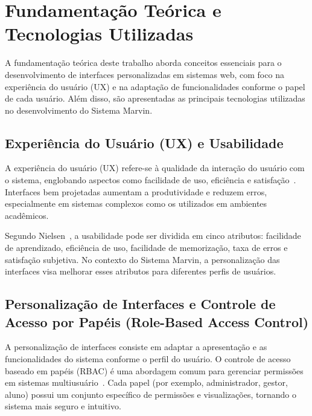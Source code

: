 

\chapter{Fundamentação Teórica e Tecnologias Utilizadas}
\label{sec-fundteo}

A fundamentação teórica deste trabalho aborda conceitos essenciais para o desenvolvimento de interfaces personalizadas em sistemas web, com foco na experiência do usuário (UX) e na adaptação de funcionalidades conforme o papel de cada usuário. Além disso, são apresentadas as principais tecnologias utilizadas no desenvolvimento do Sistema Marvin.

\section{Experiência do Usuário (UX) e Usabilidade}

A experiência do usuário (UX) refere-se à qualidade da interação do usuário com o sistema, englobando aspectos como facilidade de uso, eficiência e satisfação~\cite{norman2013design}. Interfaces bem projetadas aumentam a produtividade e reduzem erros, especialmente em sistemas complexos como os utilizados em ambientes acadêmicos.

Segundo Nielsen~\cite{nielsen1994usability}, a usabilidade pode ser dividida em cinco atributos: facilidade de aprendizado, eficiência de uso, facilidade de memorização, taxa de erros e satisfação subjetiva. No contexto do Sistema Marvin, a personalização das interfaces visa melhorar esses atributos para diferentes perfis de usuários.

\section{Personalização de Interfaces e Controle de Acesso por Papéis (Role-Based Access Control)}

A personalização de interfaces consiste em adaptar a apresentação e as funcionalidades do sistema conforme o perfil do usuário. O controle de acesso baseado em papéis (RBAC) é uma abordagem comum para gerenciar permissões em sistemas multiusuário~\cite{sandhu1996role}. Cada papel (por exemplo, administrador, gestor, aluno) possui um conjunto específico de permissões e visualizações, tornando o sistema mais seguro e intuitivo.

